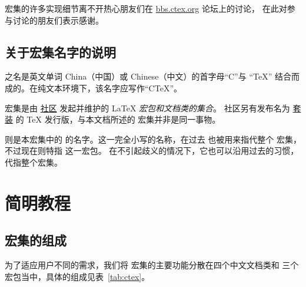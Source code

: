 \documentclass{ctxdoc}
\begin{document}
\begin{documentation}
\CTeX{} 宏集的许多实现细节离不开热心朋友们在 \url{bbs.ctex.org} 论坛上的讨论，
在此对参与讨论的朋友们表示感谢。

\subsection*{关于宏集名字的说明}

\CTeX{} 之名是英文单词 China（中国）或 Chinese（中文）的首字母“C”与 “\TeX{}”
结合而成的。在纯文本环境下，该名字应写作“CTeX”。

\CTeX{} 宏集是由 \href{http://bbs.ctex.org}{\CTeX{} 社区} 发起并维护的
\LaTeX{} \emph{宏包和文档类的集合}。
社区另有发布名为 \href{http://www.ctex.org/CTeX}{\CTeX{} 套装}
的 \TeX{} 发行版，与本文档所述的 \CTeX{} 宏集并非是同一事物。

 则是本宏集中的  的名字。这一完全小写的名称，在过去
也被用来指代整个 \CTeX{} 宏集，不过现在则特指  这一宏包。
在不引起歧义的情况下，它也可以沿用过去的习惯，代指整个宏集。

\section{简明教程}

\subsection{\CTeX{} 宏集的组成}

为了适应用户不同的需求，我们将 \CTeX{} 宏集的主要功能分散在四个中文文档类和
三个宏包当中，具体的组成见表~\ref{tab:ctex}。


\end{documentation}
\end{document}
